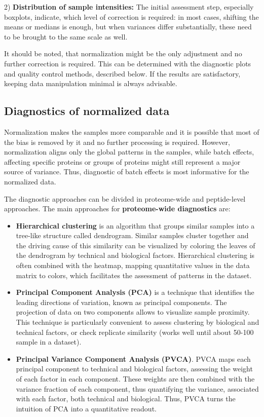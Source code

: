 \documentclass[num-refs]{wiley-article}
\begin{document}
2) \textbf{Distribution of sample intensities: }The initial assessment step, especially boxplots, indicate, which level of correction is required: in most cases, shifting the means or medians is enough, but when variances differ substantially, these need to be brought to the same scale as well.

It should be noted, that normalization might be the only adjustment and no further correction is required. This can be determined with the diagnostic plots and quality control methods, described below. If the results are satisfactory, keeping data manipulation minimal is always advisable.

\subsection{Diagnostics of normalized data}

Normalization makes the samples more comparable and it is possible that most of the bias is removed by it and no further processing is required. However, normalization aligns only the global patterns in the samples, while batch effects, affecting specific proteins or groups of proteins might still represent a major source of variance. Thus, diagnostic of batch effects is most informative for the normalized data. 

The diagnostic approaches can be divided in proteome-wide and peptide-level approaches. The main approaches for \textbf{proteome-wide diagnostics} are:
\begin{itemize}
	\item \textbf{Hierarchical clustering} is an algorithm that groups similar samples into a tree-like structure called dendrogram. Similar samples cluster together and the driving cause of this similarity can be visualized by coloring the leaves of the dendrogram by technical and biological factors. Hierarchical clustering is often combined with the heatmap, mapping quantitative values in the data matrix to colors, which facilitates the assessment of patterns in the dataset.
	\item \textbf{Principal Component Analysis (PCA)} is a technique that identifies the leading directions of variation, known as principal components. The projection of data on two components allows to visualize sample proximity. This technique is particularly convenient to assess clustering by biological and technical factors, or check replicate similarity (works well until about 50-100 sample in a dataset). 
	\item \textbf{Principal Variance Component Analysis (PVCA)}. PVCA maps each principal component to technical and biological factors, assessing the weight of each factor in each component. These weights are then combined with the variance fraction of each component, thus quantifying the variance, associated with each factor, both technical and biological. Thus, PVCA turns the intuition of PCA into a quantitative readout. 
\end{itemize}
\end{document}
